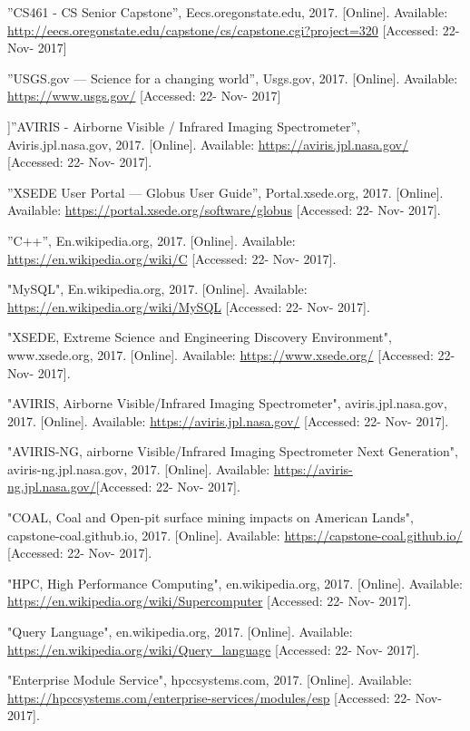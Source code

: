 \documentclass[10pt,draftclsnofoot,onecolumn,journal,compsoc]{IEEEtran}
\begin{document}
\begin{thebibliography}{9}
 ”CS461 - CS Senior Capstone”, Eecs.oregonstate.edu, 2017. [Online]. Available: \url{http://eecs.oregonstate.edu/capstone/cs/capstone.cgi?project=320} [Accessed: 22- Nov- 2017]

 ”USGS.gov — Science for a changing world”, Usgs.gov, 2017. [Online]. Available: \url{https://www.usgs.gov/} [Accessed: 22- Nov- 2017]

 ]”AVIRIS - Airborne Visible / Infrared Imaging Spectrometer”, Aviris.jpl.nasa.gov, 2017. [Online]. Available:
\url{https://aviris.jpl.nasa.gov/} [Accessed: 22- Nov- 2017].

 ”XSEDE User Portal — Globus User Guide”, Portal.xsede.org, 2017. [Online]. Available: \url{https://portal.xsede.org/software/globus} [Accessed: 22- Nov- 2017].

 ”C++”, En.wikipedia.org, 2017. [Online]. Available:
\url{https://en.wikipedia.org/wiki/C} [Accessed: 22- Nov- 2017].

 "MySQL", En.wikipedia.org, 2017. [Online]. Available: \url{https://en.wikipedia.org/wiki/MySQL} [Accessed: 22- Nov- 2017].

 "XSEDE, Extreme Science and Engineering Discovery Environment", www.xsede.org, 2017. [Online]. Available: \url{https://www.xsede.org/} [Accessed: 22- Nov- 2017].

 "AVIRIS, Airborne Visible/Infrared Imaging Spectrometer", aviris.jpl.nasa.gov, 2017. [Online]. Available: \url{https://aviris.jpl.nasa.gov/} [Accessed: 22- Nov- 2017].

 "AVIRIS-NG, airborne Visible/Infrared Imaging Spectrometer Next Generation", aviris-ng.jpl.nasa.gov, 2017. [Online]. Available: \url{https://aviris-ng.jpl.nasa.gov/}[Accessed: 22- Nov- 2017].

 "COAL, Coal and Open-pit surface mining impacts on American Lands", capstone-coal.github.io, 2017. [Online]. Available: \url{https://capstone-coal.github.io/} [Accessed: 22- Nov- 2017].

 "HPC, High Performance Computing", en.wikipedia.org, 2017. [Online]. Available: \url{https://en.wikipedia.org/wiki/Supercomputer} [Accessed: 22- Nov- 2017].

 "Query Language", en.wikipedia.org, 2017. [Online]. Available: \url{https://en.wikipedia.org/wiki/Query_language} [Accessed: 22- Nov- 2017].

 "Enterprise Module Service", hpccsystems.com, 2017. [Online]. Available: \url{https://hpccsystems.com/enterprise-services/modules/esp} [Accessed: 22- Nov- 2017].


\end{thebibliography}
\end{document}
